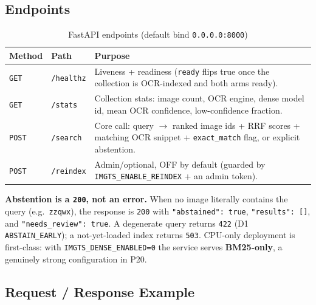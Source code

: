 \documentclass[12pt,a4paper]{article}
\begin{document}
\subsection{Endpoints}

\begin{table}[H]
\centering
\caption{FastAPI endpoints (default bind \texttt{0.0.0.0:8000})}
\small
\begin{tabularx}{\linewidth}{@{} l l L @{}}
\toprule
\textbf{Method} & \textbf{Path} & \textbf{Purpose} \\
\midrule
\texttt{GET} & \texttt{/healthz} & Liveness + readiness (\texttt{ready} flips true once the collection is OCR-indexed and both arms ready). \\
\texttt{GET} & \texttt{/stats} & Collection stats: image count, OCR engine, dense model id, mean OCR confidence, low-confidence fraction. \\
\texttt{POST} & \texttt{/search} & Core call: query $\rightarrow$ ranked image ids + RRF scores + matching OCR snippet + \texttt{exact\_match} flag, or explicit abstention. \\
\texttt{POST} & \texttt{/reindex} & Admin/optional, OFF by default (guarded by \texttt{IMGTS\_ENABLE\_REINDEX} + an admin token). \\
\bottomrule
\end{tabularx}
\end{table}

\noindent\textbf{Abstention is a \texttt{200}, not an error.} When no image literally contains the query (e.g.\ \texttt{zzqwx}), the response is \texttt{200} with \texttt{"abstained": true}, \texttt{"results": []}, and \texttt{"needs\_review": true}. A degenerate query returns \texttt{422} (D1 \texttt{ABSTAIN\_EARLY}); a not-yet-loaded index returns \texttt{503}. CPU-only deployment is first-class: with \texttt{IMGTS\_DENSE\_ENABLED=0} the service serves \textbf{BM25-only}, a genuinely strong configuration in P20.

\subsection{Request / Response Example}
\end{document}
